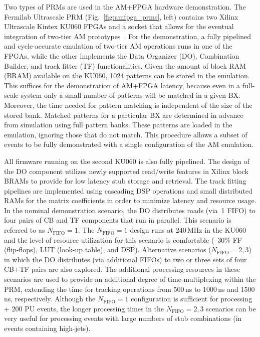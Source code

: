 Two types of PRMs are used in the AM+FPGA hardware demonstration. The Fermilab Ultrascale PRM (Fig.~\ref{fig:amfpga_prms}, left) contains two Xilinx Ultrascale Kintex KU060 FPGAs and a socket that allows for the eventual integration of two-tier AM prototypes~\cite{AM-Vipram-L1CMS}. For the demonstration, a fully pipelined and cycle-accurate emulation of two-tier AM operations runs in one of the \mbox{FPGAs}, while the other implements the Data Organizer (DO), Combination Builder, and track fitter (TF) functionalities. Given the amount of block RAM (BRAM) available on the KU060, 1024 patterns can be stored in the emulation. This suffices for the demonstration of AM+FPGA latency, because even in a full-scale system only a small number of patterns will be matched in a given BX. Moreover, the time needed for pattern matching is independent of the size of the stored bank. Matched patterns for a particular BX are determined in advance from simulation using full pattern banks. These patterns are loaded in the emulation, ignoring those that do not match. This procedure allows a subset of events to be fully demonstrated with a single configuration of the AM emulation. 

All firmware running on the second KU060 is also fully pipelined. The design of the DO component utilizes newly supported read/write features in Xilinx block BRAMs to provide for low latency stub storage and retrieval. The track fitting pipelines are implemented using cascading DSP operations and small distributed RAMs for the matrix coefficients in order to minimize latency and resource usage. In the nominal demonstration scenario, the DO distributes roads (via~1 FIFO) to four pairs of CB and TF components that run in parallel. This scenario is referred to as $N_{\text{FIFO}}=1$.  The $N_{\text{FIFO}}=1$ design runs at 240\,MHz in the KU060 and the level of resource utilization for this scenario is comfortable (--30\% FF (flip-flops), LUT (look-up table), and DSP). Alternative scenarios ($N_{\text{FIFO}}=2,3$) in which the DO distributes (via additional FIFOs) to two or three sets of four CB+TF pairs are also explored. The additional processing resources in these scenarios are used to provide an additional degree of time-multiplexing within the PRM, extending the time for tracking operations from 500\,ns to 1000\,ns and 1500\,ns, respectively. Although the $N_{\text{FIFO}}=1$ configuration is sufficient for processing \ttbar + 200 PU events, the longer processing times in the $N_{\text{FIFO}}=2,3$ scenarios can be very useful for processing events with large numbers of stub combinations (\eg in events containing high-\pt jets).

